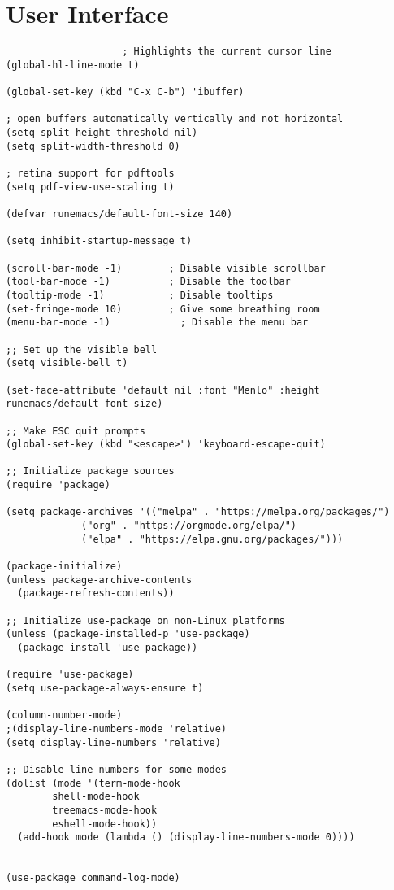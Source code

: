 \documentclass[11pt]{article}
\begin{document}
\section{User Interface}
\label{sec:org91b3046}
\begin{verbatim}
					; Highlights the current cursor line
(global-hl-line-mode t)

(global-set-key (kbd "C-x C-b") 'ibuffer)

; open buffers automatically vertically and not horizontal
(setq split-height-threshold nil)
(setq split-width-threshold 0)

; retina support for pdftools
(setq pdf-view-use-scaling t)

(defvar runemacs/default-font-size 140)

(setq inhibit-startup-message t)

(scroll-bar-mode -1)        ; Disable visible scrollbar
(tool-bar-mode -1)          ; Disable the toolbar
(tooltip-mode -1)           ; Disable tooltips
(set-fringe-mode 10)        ; Give some breathing room
(menu-bar-mode -1)            ; Disable the menu bar

;; Set up the visible bell
(setq visible-bell t)

(set-face-attribute 'default nil :font "Menlo" :height runemacs/default-font-size)

;; Make ESC quit prompts
(global-set-key (kbd "<escape>") 'keyboard-escape-quit)

;; Initialize package sources
(require 'package)

(setq package-archives '(("melpa" . "https://melpa.org/packages/")
			 ("org" . "https://orgmode.org/elpa/")
			 ("elpa" . "https://elpa.gnu.org/packages/")))

(package-initialize)
(unless package-archive-contents
  (package-refresh-contents))

;; Initialize use-package on non-Linux platforms
(unless (package-installed-p 'use-package)
  (package-install 'use-package))

(require 'use-package)
(setq use-package-always-ensure t)

(column-number-mode)
;(display-line-numbers-mode 'relative)
(setq display-line-numbers 'relative)

;; Disable line numbers for some modes
(dolist (mode '(term-mode-hook
		shell-mode-hook
		treemacs-mode-hook
		eshell-mode-hook))
  (add-hook mode (lambda () (display-line-numbers-mode 0))))


(use-package command-log-mode)


\end{verbatim}
\end{document}
